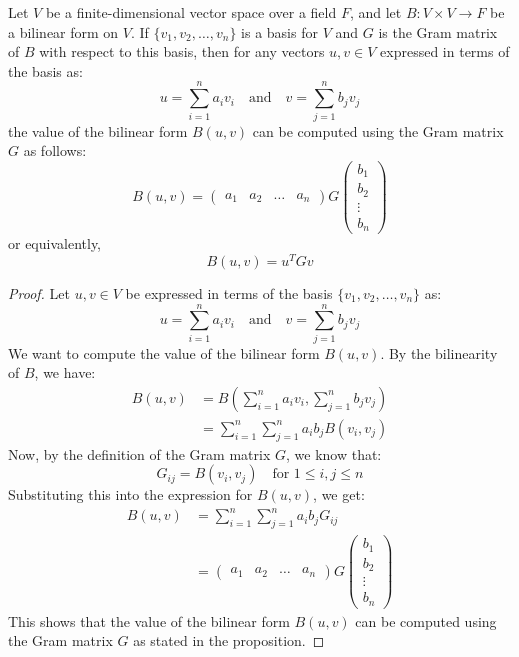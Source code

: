 \documentclass[openany]{book}
\begin{document}
\begin{mytheorem}
Let $V$ be a finite-dimensional vector space over a field $F$, and let $B: V \times V \to F$ be a bilinear form on $V$. If $\{v_1, v_2, \ldots, v_n\}$ is a basis for $V$ and $G$ is the Gram matrix of $B$ with respect to this basis, then for any vectors $u, v \in V$ expressed in terms of the basis as:
$$u = \sum_{i=1}^n a_i v_i \quad \text{and} \quad v = \sum_{j=1}^n b_j v_j$$
the value of the bilinear form $B(u, v)$ can be computed using the Gram matrix $G$ as follows:
$$B(u, v) = \begin{pmatrix} a_1 & a_2 & \ldots & a_n \end{pmatrix} G \begin{pmatrix} b_1 \\ b_2 \\ \vdots \\ b_n \end{pmatrix}$$
or equivalently, 
$$B(u, v) = u^T G v$$
\end{mytheorem}
\begin{proof}
Let $u, v \in V$ be expressed in terms of the basis $\{v_1, v_2, \ldots, v_n\}$ as:
$$u = \sum_{i=1}^n a_i v_i \quad \text{and} \quad v = \sum_{j=1}^n b_j v_j$$
We want to compute the value of the bilinear form $B(u, v)$. By the bilinearity of $B$, we have:
\[\begin{aligned}
B(u, v) &= B\left(\sum_{i=1}^n a_i v_i, \sum_{j=1}^n b_j v_j\right) \\
&= \sum_{i=1}^n \sum_{j=1}^n a_i b_j B(v_i, v_j)
\end{aligned}\]
Now, by the definition of the Gram matrix $G$, we know that:
$$G_{ij} = B(v_i, v_j) \quad \text{for } 1 \leq i, j \leq n$$
Substituting this into the expression for $B(u, v)$, we get:
\[\begin{aligned}
B(u, v) &= \sum_{i=1}^n \sum_{j=1}^n a_i b_j G_{ij} \\
&= \begin{pmatrix} a_1 & a_2 & \ldots & a_n \end{pmatrix} G \begin{pmatrix} b_1 \\ b_2 \\ \vdots \\ b_n \end{pmatrix}
\end{aligned}\]
This shows that the value of the bilinear form $B(u, v)$ can be computed using the Gram matrix $G$ as stated in the proposition.
\end{proof}
\end{document}
